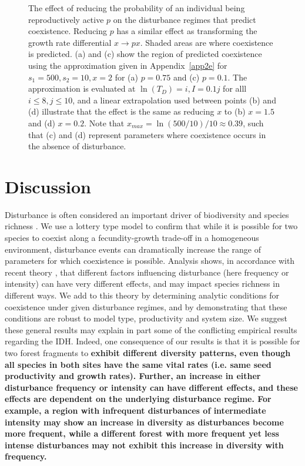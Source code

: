 \begin{figure}[htbp]
\begin{center}
\caption[Coexistence with disturbance for reduced productivity]{The effect of reducing the probability of an individual being reproductively active $p$ on the disturbance regimes that predict coexistence. Reducing $p$ has a similar effect as transforming the growth rate differential $x \to px$. Shaded areas are where coexistence is predicted. (a) and (c) show the region of predicted coexistence using the approximation given in Appendix~\ref{app2e} for $s_1=500,s_2=10,x=2$ for (a) $p=0.75$ and (c) $p=0.1$. The approximation is evaluated at $\ln(T_D)=i, I=0.1j$ for alll $i\leq8, j\leq 10$, and a linear extrapolation used between points (b) and (d) illustrate that the effect is the same as reducing $x$ to (b) $x=1.5$ and (d) $x=0.2$. Note that $x_{max}=\ln(500/10)/10\approx 0.39$, such that (c) and (d) represent parameters where coexistence occurs in the absence of disturbance.}
\label{pfigure}
\end{center}
\end{figure}


\section{Discussion} \label{discuss}
Disturbance is often considered an important driver of biodiversity and species richness \citep[e.g.][]{denslow1987tropical,lawton1988natural,sousa1984role}. We use a lottery type model to confirm that while it is possible for two species to coexist along a fecundity-growth trade-off in a homogeneous environment, disturbance events can dramatically increase the range of parameters for which coexistence is possible. Analysis shows, in accordance with recent theory \citep{miller2011frequency}, that different factors influencing disturbance (here frequency or intensity) can have very different effects, and may impact species richness in different ways. We add to this theory by determining analytic conditions for coexistence under given disturbance regimes, and by demonstrating that these conditions are robust to model type, productivity and system size. We suggest these general results may explain in part some of the conflicting empirical results regarding the IDH. Indeed, one consequence of our results is that it is possible for two forest fragments to \textbf{exhibit different diversity patterns, even though all species in both sites have the same vital rates (i.e. same seed productivity and growth rates). Further, an increase in either disturbance frequency or intensity can have different effects, and these effects are dependent on the underlying disturbance regime. For example, a region with infrequent disturbances of intermediate intensity may show an increase in diversity as disturbances become more frequent, while a different forest with more frequent yet less intense disturbances may not exhibit this increase in diversity with frequency.}

